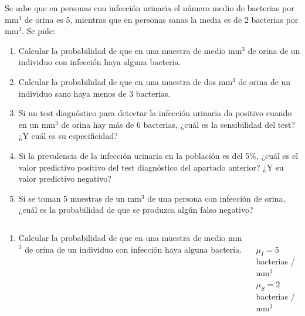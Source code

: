 \documentclass[aspectratio=149,10pt,t]{beamer}
\begin{document}
\begin{frame}[c]
\large
Se sabe que en personas con infección urinaria el número medio de bacterias por mm$^3$ de orina es 5, mientras que en personas
sanas la media es de 2 bacterias por mm$^3$.
Se pide:
\begin{enumerate}
\item Calcular la probabilidad de que en una muestra de medio mm$^3$ de orina de un individuo con infección haya alguna bacteria.
\item Calcular la probabilidad de que en una muestra de dos mm$^3$ de orina de un individuo sano haya menos de 3 bacterias.
\item Si un test diagnóstico para detectar la infección urinaria da positivo cuando en un mm$^3$ de orina hay más de 6 bacterias,
¿cuál es la sensibilidad del test? ¿Y cuál es su especificidad?
\item Si la prevalencia de la infección urinaria en la población es del 5\%, ¿cuál es el valor predictivo positivo del test
diagnóstico del apartado anterior? ¿Y su valor predictivo negativo?
\item Si se toman 5 muestras de un mm$^3$ de una persona con infección de orina, ¿cuál es la probabilidad de que se produzca
algún falso negativo?
\end{enumerate}
\end{frame}


\begin{frame}
\begin{columns}
\begin{column}[T]{0.7\textwidth}
\begin{enumerate}
\item Calcular la probabilidad de que en una muestra de medio mm$^3$ de orina de un individuo con infección haya alguna bacteria.
\end{enumerate}
\end{column}
\begin{column}[T]{0.3\textwidth}
\\
$\mu_I = 5$ bacterias / mm$^3$\\
$\mu_S = 2$ bacterias / mm$^3$\\
\end{column}
\end{columns}
\end{frame}
\end{document}
